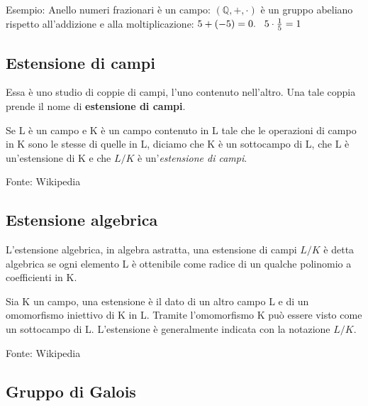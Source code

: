  

\textsf{\small Esempio: Anello numeri frazionari è un campo: $(\mathbb{Q}, +, \cdot)$ è un gruppo abeliano rispetto all'addizione e alla moltiplicazione: $5 + (-5) = 0. \hspace{.3cm} 5 \cdot \frac{1}{5} = 1$}

\subsection{Estensione di campi}

  

\textsf{\small Essa è uno studio di coppie di campi, l'uno contenuto nell'altro. Una tale coppia prende il nome di \textbf{estensione di campi}. }


\textsf{\small Se L è un campo e K è un campo contenuto in L tale che le operazioni di campo in K sono le stesse di quelle in L, diciamo che K è un sottocampo di L, che L è un'estensione di K e che $L/K$ è un'\emph{estensione di campi}.} %

\textsf{\small Fonte: Wikipedia \cite{wikipediaestensionedicampi}\relax }

\subsection{Estensione algebrica}

  

\textsf{\small L'estensione algebrica, in algebra astratta, una estensione di campi $L/K$ è detta algebrica se ogni elemento L è ottenibile come radice di un qualche polinomio a coefficienti in K.}

\textsf{\small Sia K un campo, una estensione è il dato di un altro campo L e di un omomorfismo iniettivo di K in L. Tramite l'omomorfismo K può essere visto come un sottocampo di L. L'estensione è generalmente indicata con la notazione $L/K$.} %

\textsf{\small Fonte: Wikipedia \cite{wikipediaestensionealgebrica}\relax }

\subsection{Gruppo di Galois}

